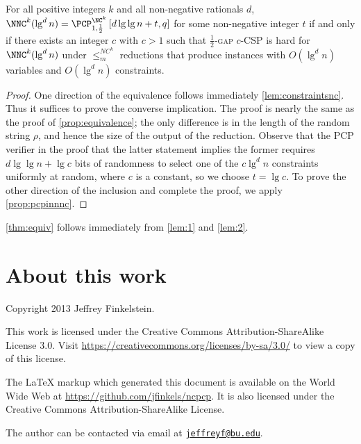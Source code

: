 \documentclass[]{article}
\newcommand{\PCPcs}[5]{\PCP^{#1}_{#2, #3}\left[#4, #5\right]}
\newcommand{\email}[1]{\href{mailto:#1}{\nolinkurl{#1}}}
\begin{document}
\begin{lemma}\label{lem:2}
  For all positive integers $k$ and all non-negative rationals $d$, $\NNC^k(\lg^d n) = \PCPcs{\NC^k}{1}{\frac{1}{2}}{d \lg \lg n + t}{q}$ for some non-negative integer $t$ if and only if there exists an integer $c$ with $c > 1$ such that \textsc{$\frac{1}{2}$-gap $c$-CSP} is hard for $\NNC^k(\lg^d n)$ under $\leq_m^{NC^k}$ reductions that produce instances with $O(\lg^d n)$ variables and $O(\lg^d n)$ constraints.
\end{lemma}
\begin{proof}
  One direction of the equivalence follows immediately \autoref{lem:constraintsnc}.
  Thus it suffices to prove the converse implication.
  The proof is nearly the same as the proof of \autoref{prop:equivalence}; the only difference is in the length of the random string $\rho$, and hence the size of the output of the reduction.
  Observe that the PCP verifier in the proof that the latter statement implies the former requires $d \lg \lg n + \lg c$ bits of randomness to select one of the $c \lg^d n$ constraints uniformly at random, where $c$ is a constant, so we choose $t = \lg c$.
  To prove the other direction of the inclusion and complete the proof, we apply \autoref{prop:pcpinnnc}.
\end{proof}

\autoref{thm:equiv} follows immediately from \autoref{lem:1} and \autoref{lem:2}.

\section{About this work}

Copyright 2013 Jef{}frey Finkelstein.

This work is licensed under the Creative Commons Attribution-ShareAlike License 3.0.
Visit \mbox{\url{https://creativecommons.org/licenses/by-sa/3.0/}} to view a copy of this license.

The \LaTeX{} markup which generated this document is available on the World Wide Web at \mbox{\url{https://github.com/jfinkels/ncpcp}}.
It is also licensed under the Creative Commons Attribution-ShareAlike License.

The author can be contacted via email at \email{jeffreyf@bu.edu}.



\end{document}
